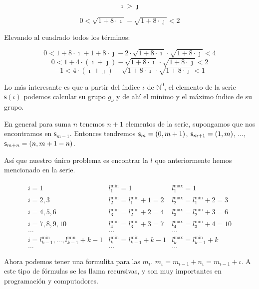 \documentclass{amsart}
\theoremstyle{definition}
\theoremstyle{remark}
\numberwithin{equation}{section}
\newcommand{\setN}{\mathds N}
\begin{document}
$$
\imath > \jmath
$$


$$
0 < \sqrt{1+8\cdot\imath}-\sqrt{1+8\cdot\jmath} < 2
$$


	Elevando al cuadrado todos los términos:


$$
0 <
1 + 8 \cdot \imath + 1 + 8 \cdot \jmath -
2 \cdot \sqrt{ 1 + 8 \cdot \imath } \cdot \sqrt{ 1 + 8 \cdot \jmath }
< 4
$$
$$
0 <
1 + 4 \cdot \left(\imath + \jmath\right) -
\sqrt{ 1 + 8 \cdot \imath } \cdot \sqrt{ 1 + 8 \cdot \jmath }
< 2
$$
$$
-1 <
4 \cdot \left(\imath + \jmath\right) -
\sqrt{ 1 + 8 \cdot \imath } \cdot \sqrt{ 1 + 8 \cdot \jmath }
< 1
$$














	Lo más interesante es que a partir del índice $\iota$ de $\setN^{0}$, el
elemento de la serie $\textsf{s}{\left({\iota}\right)}$ podemos calcular su
grupo $g_{\nu}$ y de ahí el mínimo y el máximo índice de su grupo.


	En general para suma $n$ tenemos $n+1$ elementos de la serie, supongamos
que nos encontramos en $\textsf{s}_{m-1}$. Entonces tendremos
$\textsf{s}_{m}=\left({{0},{m+1}}\right)$, $\textsf{s}_{m+1}=\left({{1},{m}}\right)$, ...,
$\textsf{s}_{m+n}=\left({{n},{m+1-n}}\right)$.



Así que nuestro único problema es encontrar la $l$ que anteriormente hemos
mencionado en la serie.

\newcommand {\mmin}[1]{l^{\min}_{#1}}
\newcommand {\mmax}[1]{l^{\max}_{#1}}
$$
\begin{matrix}
i = 1           & \mmin{1} = 1                & \mmax{1} = 1 \\
i = 2, 3        & \mmin{2} = \mmin{1} + 1 = 2 & \mmax{2} = \mmin{1} + 2 =  3
\\
i = 4, 5, 6     & \mmin{3} = \mmin{2} + 2 = 4 & \mmax{3} = \mmin{2} + 3 =  6
\\
i = 7, 8, 9, 10 & \mmin{4} = \mmin{3} + 3 = 7 & \mmax{4} = \mmin{3} + 4 = 10
\\
\ldots          & \ldots         & \ldots\\
i = \mmin{k-1}, ..., \mmin{k-1}+{k-1} & \mmin{k} = \mmin{k-1} + {k-1} &
\mmax{k} = \mmin{k-1} + k \\
\ldots & \ldots & \ldots
\end{matrix}
$$


	Ahora podemos tener una formulita para las $m_{\iota}$. $m_{\iota} =
m_{\iota - 1} + n_{\iota} = m_{\iota - 1} + \iota$. A este tipo de fórmulas
se les llama recursivas, y son muy importantes en programación y
computadores.
\end{document}
